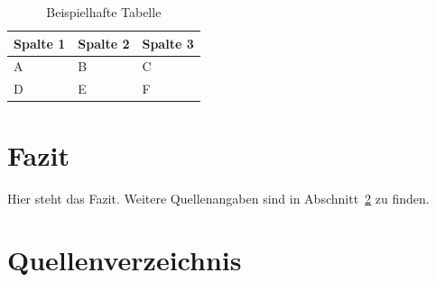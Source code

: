 \documentclass[a4paper,12pt]{article}
\begin{document}
\begin{table}[h!]
    \centering
    \begin{tabular}{lll}
        \toprule
        Spalte 1 & Spalte 2 & Spalte 3 \\
        \midrule
        A & B & C \\
        D & E & F \\
        \bottomrule
    \end{tabular}
    \caption{Beispielhafte Tabelle}
    \label{tab:example}
\end{table}

\newpage
\section{Fazit}
Hier steht das Fazit. Weitere Quellenangaben sind in Abschnitt~\ref{sec:references} zu finden.

\newpage
\section{Quellenverzeichnis}
\label{sec:references}
\printbibliography
\end{document}
